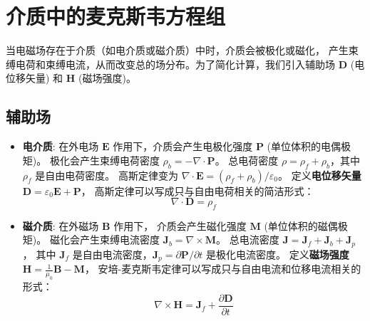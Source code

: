 \documentclass[fontset=none]{ctexart}
\begin{document}
\section{介质中的麦克斯韦方程组}
当电磁场存在于介质（如电介质或磁介质）中时，介质会被极化或磁化，
产生束缚电荷和束缚电流，从而改变总的场分布。为了简化计算，我们引入辅助场 $\bm{D}$ (电位移矢量) 
和 $\bm{H}$ (磁场强度)。
\subsection{辅助场}
\begin{itemize}
    \item \textbf{电介质}: 在外电场 $\bm{E}$ 作用下，介质会产生电极化强度 $\bm{P}$ (单位体积的电偶极矩)。
    极化会产生束缚电荷密度 $\rho_b = -\nabla \cdot \bm{P}$。
    总电荷密度 $\rho = \rho_f + \rho_b$，其中 $\rho_f$ 是自由电荷密度。
    高斯定律变为 $\nabla \cdot \bm{E} = (\rho_f + \rho_b)/\varepsilon_0$。
    定义\textbf{电位移矢量} $\bm{D} = \varepsilon_0 \bm{E} + \bm{P}$，
    高斯定律可以写成只与自由电荷相关的简洁形式：
    \begin{equation}
        \nabla \cdot \bm{D} = \rho_f
    \end{equation}
    \item \textbf{磁介质}: 在外磁场 $\bm{B}$ 作用下，
    介质会产生磁化强度 $\bm{M}$ (单位体积的磁偶极矩)。
    磁化会产生束缚电流密度 $\bm{J}_b = \nabla \times \bm{M}$。
    总电流密度 $\bm{J} = \bm{J}_f + \bm{J}_b + \bm{J}_p$，
    其中 $\bm{J}_f$ 是自由电流密度，$\bm{J}_p = \partial\bm{P}/\partial t$ 是极化电流密度。
    定义\textbf{磁场强度} $\bm{H} = \frac{1}{\mu_0}\bm{B} - \bm{M}$，
    安培-麦克斯韦定律可以写成只与自由电流和位移电流相关的形式：
    \begin{equation}
        \nabla \times \bm{H} = \bm{J}_f + \frac{\partial \bm{D}}{\partial t}
    \end{equation}
\end{itemize}
\end{document}
